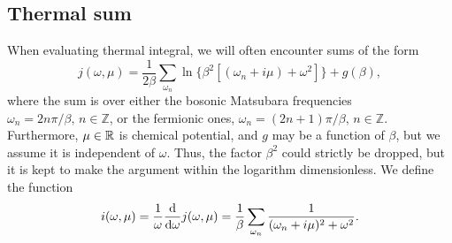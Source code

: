\subsection{Thermal sum}
\label{section: thermal sum}

When evaluating thermal integral, we will often encounter sums of the form
%
\begin{equation}
    \label{j func}
    j(\omega, \mu) = \frac{1}{2\beta} \sum_{\omega_n} 
    \ln\{\beta^2 [(\omega_n + i \mu) + \omega^2] \} + g(\beta),
\end{equation}
%
where the sum is over either the bosonic Matsubara frequencies $\omega_n = 2n \pi / \beta,\, n \in \mathbb{Z}$, or the fermionic ones, $\omega_n = (2n + 1) \pi /\beta ,\, n \in \mathbb{Z}$.
Furthermore, $\mu \in \mathbb{R}$ is chemical potential, and $g$ may be a function of $\beta$, but we assume it is independent of $\omega$.
Thus, the factor $\beta^2$ could strictly be dropped, but it is kept to make the argument within the logarithm dimensionless.
We define the function
%
\begin{equation}
    \label{i func}
    i(\omega, \mu) 
    = \frac{1}{\omega} \odv{}{\omega} j(\omega, \mu) 
    = \frac{1}{\beta} \sum_{\omega_n} \frac{1}{(\omega_n + i\mu)^2 + \omega^2}. 
\end{equation}


